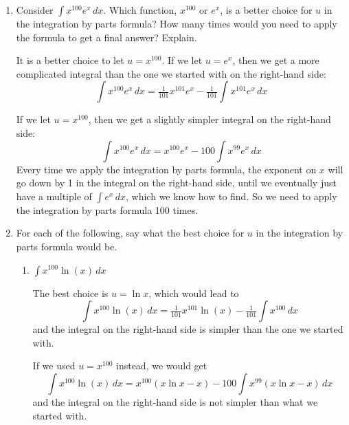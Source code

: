 \documentclass{article}
\begin{document}
\begin{enumerate}
\begin{enumerate}
\end{enumerate}



\item

\begin{problem}[\vfill]
    Consider $\displaystyle \int x^{100}e^x\,dx$. Which function, $x^{100}$ or $e^x$, is a better choice for $u$ in the integration by parts formula? How many times would you need to apply the formula to get a final answer? Explain.
\end{problem}

\begin{solution}
    It is a better choice to let $u=x^{100}$. If we let $u=e^x$, then we get a more complicated integral than the one we started with on the right-hand side:
    \[\int x^{100}e^x\,dx = \tfrac{1}{101}x^{101}e^x - \tfrac{1}{101}\int x^{101}e^x\,dx \]
    
    If we let $u=x^{100}$, then we get a slightly simpler integral on the right-hand side:
    \[\int x^{100}e^x\,dx = x^{100}e^x - 100\int x^{99}e^x\,dx \]
    Every time we apply the integration by parts formula, the exponent on $x$ will go down by 1 in the integral on the right-hand side, until we eventually just have a multiple of $\int e^x \,dx$, which we know how to find. So we need to apply the integration by parts formula 100 times.
\end{solution}

\item 

For each of the following, say what the best choice for $u$ in the integration by parts formula would be.
\begin{enumerate}
    \item 
    \begin{problem}
    $\displaystyle \int x^{100} \ln(x)\,dx$
    \end{problem}

    \begin{solution}
        The best choice is $u=\ln x$, which would lead to
        \[\int x^{100}\ln(x)\,dx = \tfrac{1}{101}x^{101}\ln(x) - \tfrac{1}{101}\!\int x^{100}\,dx \]
        and the integral on the right-hand side is simpler than the one we started with.

        If we used $u=x^{100}$ instead, we would get 
        \[\int x^{100}\ln(x)\,dx = x^{100}(x\ln x-x) - 100\int x^{99}(x\ln x - x) \,dx \]
        and the integral on the right-hand side is not simpler than what we started with.
    \end{solution}
    

\end{enumerate}
\end{enumerate}
\end{document}
